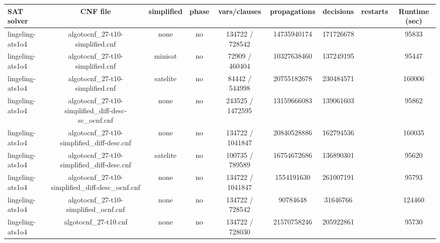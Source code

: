 \begin{appendices}
\begin{table}[p]
  \begin{center}
    \begin{tabular}{l|cccccccc}
        \textbf{SAT solver} & \textbf{CNF file} & \textbf{simplified} & \textbf{phase} & \textbf{vars/clauses} & \textbf{propagations} & \textbf{decisions} & \textbf{restarts} & \textbf{Runtime (sec)} \\
      \hline
  lingeling-ats1o4               & algotocnf\_27-t10-simplified.cnf & none       & no    & 134722 / 728542 & 14735940174 & 171726678 &            & 95833 \\ %
  lingeling-ats1o4               & algotocnf\_27-t10-simplified.cnf & minisat    & no    & 72909 / 460404 & 10327638460 & 137249195 &            & 95447 \\ %
  lingeling-ats1o4               & algotocnf\_27-t10-simplified.cnf & satelite   & no    & 84442 / 544998 & 20755182678 & 230484571 &            & 160006 \\ %
  lingeling-ats1o4               & algotocnf\_27-t10-simplified\_diff-desc-sc\_ocnf.cnf & none       & no    & 243525 / 1472595 & 13159666083 & 139061603 &            & 95862 \\ %
  lingeling-ats1o4               & algotocnf\_27-t10-simplified\_diff-desc.cnf & none       & no    & 134722 / 1041847 & 20840528886 & 162794536 &            & 160035 \\ %
  lingeling-ats1o4               & algotocnf\_27-t10-simplified\_diff-desc.cnf & satelite   & no    & 100735 / 789589 & 16754672686 & 136890301 &            & 95620 \\ %
  lingeling-ats1o4               & algotocnf\_27-t10-simplified\_diff-desc\_ocnf.cnf & none       & no    & 134722 / 1041847 & 1554191630 & 261007191 &            & 95793 \\ %
  lingeling-ats1o4               & algotocnf\_27-t10-simplified\_ocnf.cnf & none       & no    & 134722 / 728542 & 90784648  & 31646766  &            & 124460 \\ %
  lingeling-ats1o4               & algotocnf\_27-t10.cnf          & none       & no    & 134722 / 728030 & 21570758246 & 205922861 &            & 95730 \\ %

\end{tabular}
\end{center}
\end{table}
\end{appendices}
